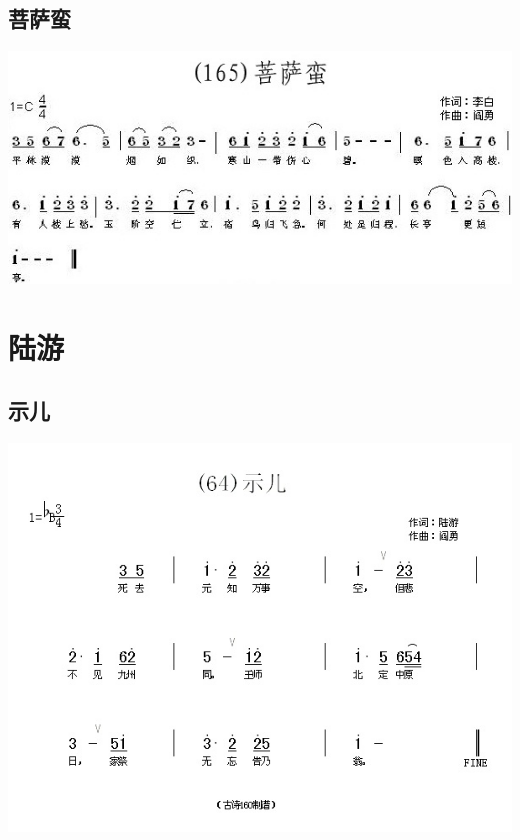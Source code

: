 \documentclass[cn,pad,twocol]{elegantbook}
\begin{document}
\section{菩萨蛮}    \includegraphics[width=\textwidth]{dongxiao/20200808-菩萨蛮-李白.jpg}
      
\chapter{陆游}
\section{示儿}      \includegraphics[width=\textwidth]{dongxiao/20200808-示儿-陆游.jpg} 
\end{document}
